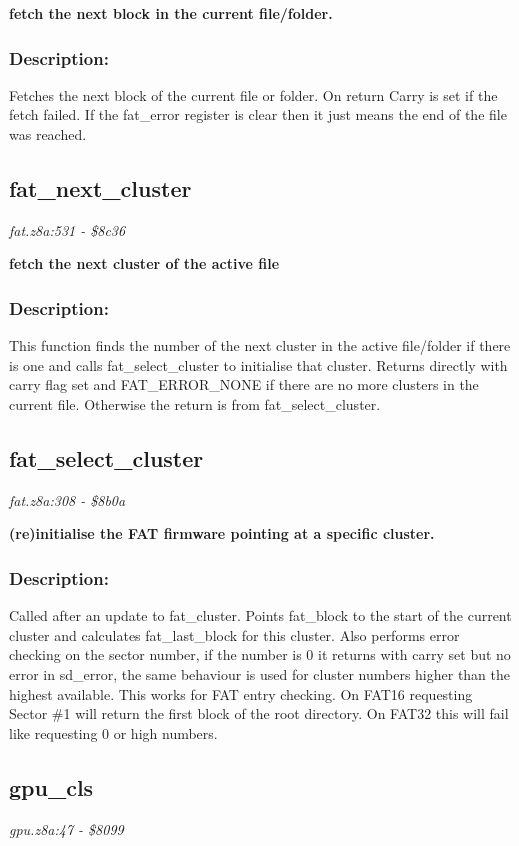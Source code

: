 \noindent
\textbf{fetch the next block in the current file/folder.}

\subsubsection{Description:}
 Fetches the next block of the current file or folder.  On return Carry is set if the fetch failed.  If the fat\_error register is clear then it just means the end of the file was reached.

\subsection{fat\_next\_cluster}
\textit{fat.z8a:531 - \$8c36}

\noindent
\textbf{fetch the next cluster of the active file}

\subsubsection{Description:}
 This function finds the number of the next cluster in the active file/folder if there is one and calls fat\_select\_cluster to initialise that cluster. Returns directly with carry flag set and FAT\_ERROR\_NONE if there are no more clusters in the current file.  Otherwise the return is from fat\_select\_cluster.

\subsection{fat\_select\_cluster}
\textit{fat.z8a:308 - \$8b0a}

\noindent
\textbf{(re)initialise the FAT firmware pointing at a specific cluster.}

\subsubsection{Description:}
 Called after an update to fat\_cluster.  Points fat\_block to the start of the current cluster and calculates fat\_last\_block for this cluster.  Also performs error checking on the sector number, if the number is 0 it returns with carry set but no error in sd\_error, the same behaviour is used for cluster numbers higher than the highest available.  This works for FAT entry checking.  On FAT16 requesting Sector \#1 will return the first block of the root directory.  On FAT32 this will fail like requesting 0 or high numbers.

\subsection{gpu\_cls}
\textit{gpu.z8a:47 - \$8099}

